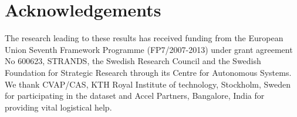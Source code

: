 \documentclass[letterpaper, 10 pt, conference]{ieeeconf}  %
\begin{document}
\section{Acknowledgements}
\label{sec:Acknowledgements}

The research leading to these results has received funding from the European
Union Seventh Framework Programme (FP7/2007-2013) under grant agreement No 600623, STRANDS,
the Swedish Research Council and the Swedish Foundation for Strategic Research through its Centre for Autonomous Systems.
We thank CVAP/CAS, KTH Royal Institute of technology, Stockholm, Sweden for participating in the dataset and Accel Partners, Bangalore, India for providing vital logistical help.



\end{document}
